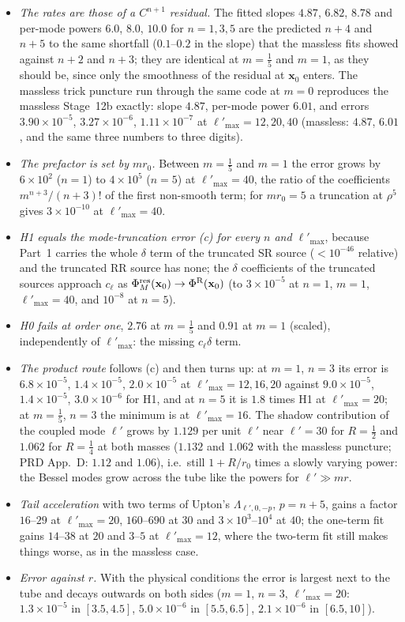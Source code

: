 \documentclass[11pt,a4paper]{article}
\newcommand{\x}{\mathbf{x}}
\newcommand{\PhiR}{\Phi^{\rm R}}
\newcommand{\Pres}{\Phi^{\rm res}}
\newcommand{\lpm}{{\ell'_{\max}}}
\begin{document}
\begin{itemize}[leftmargin=*]
\item \emph{The rates are those of a $C^{n+1}$ residual.} The fitted slopes $4.87$, $6.82$, $8.78$ and per-mode powers $6.0$, $8.0$, $10.0$ for $n=1,3,5$ are the predicted $n+4$ and $n+5$ to the same shortfall ($0.1$--$0.2$ in the slope) that the massless fits showed against $n+2$ and $n+3$; they are identical at $m=\tfrac15$ and $m=1$, as they should be, since only the smoothness of the residual at $\x_0$ enters. The massless trick puncture run through the same code at $m=0$ reproduces the massless Stage~12b exactly: slope $4.87$, per-mode power $6.01$, and errors $3.90\times10^{-5}$, $3.27\times10^{-6}$, $1.11\times10^{-7}$ at $\lpm=12,20,40$ (massless: $4.87$, $6.01$, and the same three numbers to three digits).
\item \emph{The prefactor is set by $mr_0$.} Between $m=\tfrac15$ and $m=1$ the error grows by $6\times10^2$ ($n=1$) to $4\times10^5$ ($n=5$) at $\lpm=40$, the ratio of the coefficients $m^{n+3}/(n+3)!$ of the first non-smooth term; for $mr_0=5$ a truncation at $\rho^5$ gives $3\times10^{-10}$ at $\lpm=40$.
\item \emph{H1 equals the mode-truncation error (c) for every $n$ and $\lpm$}, because Part~1 carries the whole $\delta$ term of the truncated SR source ($<10^{-46}$ relative) and the truncated RR source has none; the $\delta$ coefficients of the truncated sources approach $c_\ell$ as $\Pres_M(\x_0)\to\PhiR(\x_0)$ (to $3\times10^{-5}$ at $n=1$, $m=1$, $\lpm=40$, and $10^{-8}$ at $n=5$).
\item \emph{H0 fails at order one}, $2.76$ at $m=\tfrac15$ and $0.91$ at $m=1$ (scaled), independently of $\lpm$: the missing $c_\ell\delta$ term.
\item \emph{The product route} follows (c) and then turns up: at $m=1$, $n=3$ its error is $6.8\times10^{-5}$, $1.4\times10^{-5}$, $2.0\times10^{-5}$ at $\lpm=12,16,20$ against $9.0\times10^{-5}$, $1.4\times10^{-5}$, $3.0\times10^{-6}$ for H1, and at $n=5$ it is $1.8$ times H1 at $\lpm=20$; at $m=\tfrac15$, $n=3$ the minimum is at $\lpm=16$. The shadow contribution of the coupled mode $\ell'$ grows by $1.129$ per unit $\ell'$ near $\ell'=30$ for $R=\tfrac12$ and $1.062$ for $R=\tfrac14$ at both masses ($1.132$ and $1.062$ with the massless puncture; PRD App.~D: $1.12$ and $1.06$), i.e.\ still $1+R/r_0$ times a slowly varying power: the Bessel modes grow across the tube like the powers for $\ell'\gg mr$.
\item \emph{Tail acceleration} with two terms of Upton's $\Lambda_{\ell',0,-p}$, $p=n+5$, gains a factor $16$--$29$ at $\lpm=20$, $160$--$690$ at $30$ and $3\times10^3$--$10^4$ at $40$; the one-term fit gains $14$--$38$ at $20$ and $3$--$5$ at $\lpm=12$, where the two-term fit still makes things worse, as in the massless case.
\item \emph{Error against $r$.} With the physical conditions the error is largest next to the tube and decays outwards on both sides ($m=1$, $n=3$, $\lpm=20$: $1.3\times10^{-5}$ in $[3.5,4.5]$, $5.0\times10^{-6}$ in $[5.5,6.5]$, $2.1\times10^{-6}$ in $[6.5,10]$).
\end{itemize}
\end{document}
